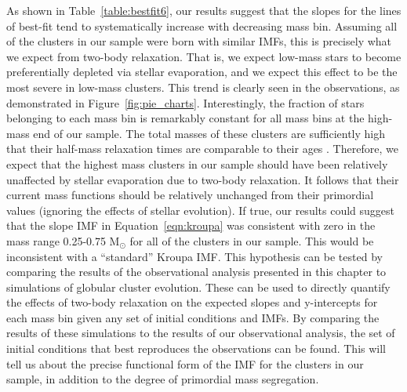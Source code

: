 As shown in Table~\ref{table:bestfit6}, our results suggest that the slopes
for the lines of best-fit tend to systematically increase
with decreasing mass bin.  Assuming all of the clusters in our sample
were born with similar IMFs, this is precisely what we expect from
two-body relaxation.  That is, we expect low-mass stars to become
preferentially depleted via stellar evaporation, and we expect this
effect to be the most severe in low-mass clusters.  This trend is
clearly seen in the observations, as demonstrated in 
Figure~\ref{fig:pie_charts}.  Interestingly, the fraction of stars
belonging to each mass bin is remarkably constant for all mass bins at
the high-mass end of our sample.  The total masses of these clusters
are sufficiently high that their half-mass relaxation times are
comparable to their ages \citep[e.g.][]{harris96}.  Therefore, we
expect that the highest mass clusters in our sample should have
been relatively unaffected by stellar evaporation due to two-body
relaxation.  It follows that their current mass functions should be
relatively unchanged from their primordial values (ignoring the
effects of stellar evolution).  If true, our
results could suggest that the slope IMF in Equation~\ref{eqn:kroupa}
was consistent with zero in the
mass range 0.25-0.75 M$_{\odot}$ for all of the clusters in our
sample.  This would be inconsistent with a ``standard'' Kroupa IMF.  This
hypothesis can be tested by comparing the results of the 
observational analysis presented in this chapter to simulations of
globular cluster evolution.  These can be used to directly quantify
the effects of two-body relaxation on the expected slopes and
y-intercepts for each mass bin given any set of initial conditions and
IMFs.  By comparing the results of these simulations to the results of
our observational analysis, the set of initial conditions that
best reproduces the observations can be found.  This will tell us
about the precise functional form of the IMF for the clusters in our
sample, in addition to the degree of primordial mass segregation.

